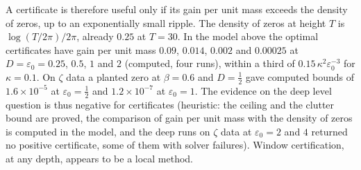 A certificate is therefore useful only if its gain per unit mass exceeds the density of zeros, up to an exponentially small ripple. The density of zeros at height $T$ is $\log(T/2\pi)/2\pi$, already $0.25$ at $T=30$. In the model above the optimal certificates have gain per unit mass $0.09$, $0.014$, $0.002$ and $0.00025$ at $D=\varepsilon_0=0.25$, $0.5$, $1$ and $2$ (computed, four runs), within a third of $0.15\,\kappa^2\varepsilon_0^{-3}$ for $\kappa=0.1$. On $\zeta$ data a planted zero at $\beta=0.6$ and $D=\tfrac12$ gave computed bounds of $1.6\times10^{-5}$ at $\varepsilon_0=\tfrac12$ and $1.2\times10^{-7}$ at $\varepsilon_0=1$. The evidence on the deep level question is thus negative for certificates (heuristic: the ceiling and the clutter bound are proved, the comparison of gain per unit mass with the density of zeros is computed in the model, and the deep runs on $\zeta$ data at $\varepsilon_0=2$ and $4$ returned no positive certificate, some of them with solver failures). Window certification, at any depth, appears to be a local method.
